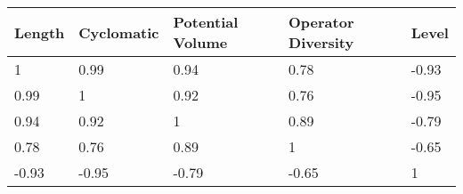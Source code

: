 \begin{tabular}{lllll}
Length & Cyclomatic & Potential Volume & Operator Diversity & Level \\ 
\hline 
1 & 0.99 & 0.94 & 0.78 & -0.93 \\ 
0.99 & 1 & 0.92 & 0.76 & -0.95 \\ 
0.94 & 0.92 & 1 & 0.89 & -0.79 \\ 
0.78 & 0.76 & 0.89 & 1 & -0.65 \\ 
-0.93 & -0.95 & -0.79 & -0.65 & 1 \\ 
\hline 
\end{tabular}